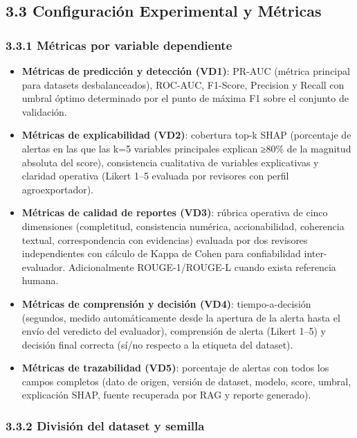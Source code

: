 \subsection{3.3 Configuración Experimental y
Métricas}\label{configuraciuxf3n-experimental-y-muxe9tricas}

\subsubsection{3.3.1 Métricas por variable
dependiente}\label{muxe9tricas-por-variable-dependiente}

\begin{itemize}
\tightlist
\item
  \textbf{Métricas de predicción y detección (VD1)}: PR-AUC (métrica
  principal para datasets desbalanceados), ROC-AUC, F1-Score, Precision
  y Recall con umbral óptimo determinado por el punto de máxima F1 sobre
  el conjunto de validación.
\item
  \textbf{Métricas de explicabilidad (VD2)}: cobertura top-k SHAP
  (porcentaje de alertas en las que las k=5 variables principales
  explican ≥80\% de la magnitud absoluta del score), consistencia
  cualitativa de variables explicativas y claridad operativa (Likert
  1--5 evaluada por revisores con perfil agroexportador).
\item
  \textbf{Métricas de calidad de reportes (VD3)}: rúbrica operativa de
  cinco dimensiones (completitud, consistencia numérica, accionabilidad,
  coherencia textual, correspondencia con evidencias) evaluada por dos
  revisores independientes con cálculo de Kappa de Cohen para
  confiabilidad inter-evaluador. Adicionalmente ROUGE-1/ROUGE-L cuando
  exista referencia humana.
\item
  \textbf{Métricas de comprensión y decisión (VD4)}: tiempo-a-decisión
  (segundos, medido automáticamente desde la apertura de la alerta hasta
  el envío del veredicto del evaluador), comprensión de alerta (Likert
  1--5) y decisión final correcta (sí/no respecto a la etiqueta del
  dataset).
\item
  \textbf{Métricas de trazabilidad (VD5)}: porcentaje de alertas con
  todos los campos completos (dato de origen, versión de dataset,
  modelo, score, umbral, explicación SHAP, fuente recuperada por RAG y
  reporte generado).
\end{itemize}

\subsubsection{3.3.2 División del dataset y
semilla}\label{divisiuxf3n-del-dataset-y-semilla}

